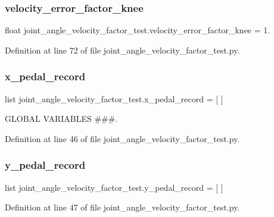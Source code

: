 \subsubsection{\texorpdfstring{velocity\_error\_factor\_knee}{velocity\_error\_factor\_knee}}
{\footnotesize\ttfamily float joint\+\_\+angle\+\_\+velocity\+\_\+factor\+\_\+test.\+velocity\+\_\+error\+\_\+factor\+\_\+knee = 1.}



Definition at line 72 of file joint\+\_\+angle\+\_\+velocity\+\_\+factor\+\_\+test.\+py.

\mbox{\label{namespacejoint__angle__velocity__factor__test_a4a0c0e53f8765b09a181b9a4a99c11a8}} 
\subsubsection{\texorpdfstring{x\_pedal\_record}{x\_pedal\_record}}
{\footnotesize\ttfamily list joint\+\_\+angle\+\_\+velocity\+\_\+factor\+\_\+test.\+x\+\_\+pedal\+\_\+record = \mbox{[} \mbox{]}}



G\+L\+O\+B\+AL V\+A\+R\+I\+A\+B\+L\+ES \#\#\#. 



Definition at line 46 of file joint\+\_\+angle\+\_\+velocity\+\_\+factor\+\_\+test.\+py.

\mbox{\label{namespacejoint__angle__velocity__factor__test_a3b3b88f2814ab8d781c35d2b10785bbf}} 
\subsubsection{\texorpdfstring{y\_pedal\_record}{y\_pedal\_record}}
{\footnotesize\ttfamily list joint\+\_\+angle\+\_\+velocity\+\_\+factor\+\_\+test.\+y\+\_\+pedal\+\_\+record = \mbox{[} \mbox{]}}



Definition at line 47 of file joint\+\_\+angle\+\_\+velocity\+\_\+factor\+\_\+test.\+py.

